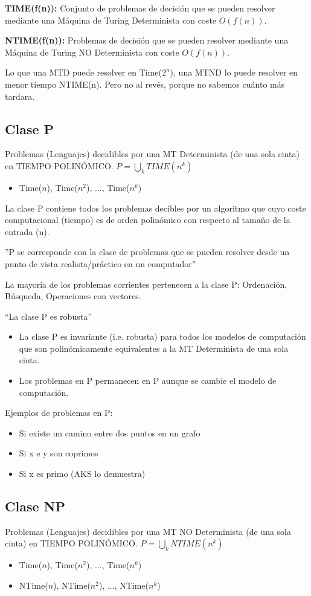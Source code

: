 \textbf{TIME(f(n)):} Conjunto de problemas de decisión que se pueden resolver mediante una Máquina de Turing Determinista con coste $O(f(n))$.

\textbf{NTIME(f(n)):} Problemas de decisión que se pueden resolver mediante una Máquina de Turing NO Determinista con coste $O(f(n))$.

Lo que una MTD puede resolver en Time($2^n$), una MTND  lo puede resolver en menor tiempo NTIME(n). Pero no al revés, porque no sabemos cuánto más tardara. 

\subsection{Clase P}
Problemas (Lenguajes) decidibles por una MT Determinista (de una sola cinta) en TIEMPO POLINÓMICO. $P= \bigcup_k TIME(n^k)$
\begin{itemize}
  \item Time($n$), Time($n^2$), ..., Time($n^k$)
\end{itemize}

La clase P contiene todos los problemas decibles por un algoritmo que cuyo coste computacional (tiempo) es de orden polinómico con respecto al tamaño de la entrada (n).

''P se corresponde con la clase de problemas que se pueden resolver desde un punto de vista realista/práctico en un computador''

La mayoría de los problemas corrientes pertenecen a la clase P: Ordenación, Búsqueda, Operaciones con vectores.

“La clase P es robusta”
\begin{itemize}
  \item La clase P es invariante (i.e. robusta) para todos los modelos de computación que son polinómicamente equivalentes a la MT Determinista de una sola cinta.
  \item Los problemas en P permanecen en P aunque se cambie el modelo de computación.
\end{itemize}

Ejemplos de problemas en P:
\begin{itemize}
  \item Si existe un camino entre dos puntos en un grafo
  \item Si x e y son coprimos
  \item Si x es primo (AKS lo demuestra)
\end{itemize}

\subsection{Clase NP}
Problemas (Lenguajes) decidibles por una MT NO Determinista (de una sola cinta) en TIEMPO POLINÓMICO. $P= \bigcup_k NTIME(n^k)$
\begin{itemize}
  \item Time($n$), Time($n^2$), ..., Time($n^k$)
  \item NTime($n$), NTime($n^2$), ..., NTime($n^k$)
\end{itemize}

